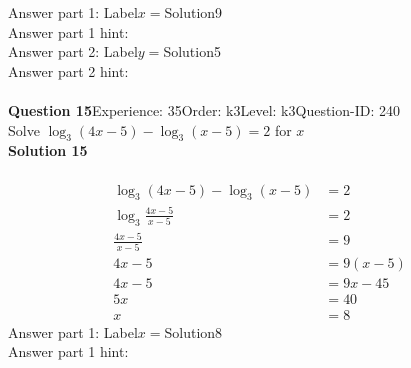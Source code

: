 \documentclass{article}
\begin{document}
Answer part 1: \hspace{10pt}Label\hspace{10pt}$x=$\hspace{10pt}Solution\hspace{10pt}9\\
Answer part 1 hint: \hspace{15pt}\\
Answer part 2: \hspace{10pt}Label\hspace{10pt}$y=$\hspace{10pt}Solution\hspace{10pt}5\\
Answer part 2 hint: \hspace{15pt}\\
\\[4pt]
\noindent\textbf{Question 15}\hspace{20pt}Experience: 35\hspace{20pt}Order: k3\hspace{20pt}Level: k3\hspace{20pt}Question-ID: 240\\[2pt]
Solve $\log_{3}(4x-5)-\log_{3}(x-5)=2$ for $x$\\[4pt]
\noindent\textbf{Solution 15}\\[2pt]
\\[-35pt]\begin{align*}
\log_{3}(4x-5)-\log_{3}(x-5)&=2\\[2pt]
\log_{3}\displaystyle\frac{4x-5}{x-5}&=2\\[2pt]
\displaystyle\frac{4x-5}{x-5}&=9\\[2pt]
4x-5&=9(x-5)\\[2pt]
4x-5&=9x-45\\[2pt]
5x&=40\\[2pt]
x&=8
\end{align*}
Answer part 1: \hspace{10pt}Label\hspace{10pt}$x=$\hspace{10pt}Solution\hspace{10pt}8\\
Answer part 1 hint: \hspace{15pt}\\
\\[4pt]
\end{document}

